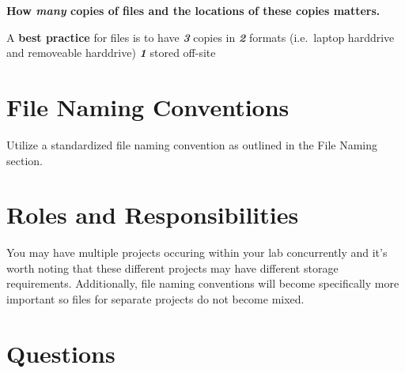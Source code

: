 \documentclass[
]{book}
\begin{document}
\textbf{How \emph{many} copies of files and the locations of these copies matters.}

A \textbf{best practice} for files is to have
\textbf{\emph{3}} copies in
\textbf{\emph{2}} formats (i.e.~laptop harddrive and removeable harddrive)
\textbf{\emph{1}} stored off-site

\hypertarget{file-naming-conventions-1}{%
\section*{File Naming Conventions}\label{file-naming-conventions-1}}

Utilize a standardized file naming convention as outlined in the File Naming section.

\hypertarget{roles-and-responsibilities-5}{%
\section*{Roles and Responsibilities}\label{roles-and-responsibilities-5}}

You may have multiple projects occuring within your lab concurrently and it's worth noting that these different projects may have different storage requirements. Additionally, file naming conventions will become specifically more important so files for separate projects do not become mixed.

\hypertarget{questions-7}{%
\section*{Questions}\label{questions-7}}
\end{document}
